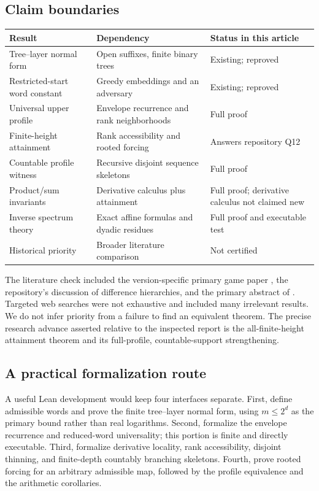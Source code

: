 \documentclass[11pt,letterpaper]{article}
\numberwithin{equation}{section}
\theoremstyle{definition}
\theoremstyle{remark}
\theoremstyle{definition}
\begin{document}
\subsection{Claim boundaries}
\begin{center}
\begin{tabular}{@{}>{\raggedright\arraybackslash}p{}
 >{\raggedright\arraybackslash}p{}
 >{\raggedright\arraybackslash}p{}@{}}
\toprule
Result & Dependency & Status in this article\\
\midrule
Tree--layer normal form & Open suffixes, finite binary trees & Existing; reproved\\
Restricted-start word constant & Greedy embeddings and an adversary & Existing; reproved\\
Universal upper profile & Envelope recurrence and rank neighborhoods & Full proof\\
Finite-height attainment & Rank accessibility and rooted forcing & Answers repository Q12\\
Countable profile witness & Recursive disjoint sequence skeletons & Full proof\\
Product/sum invariants & Derivative calculus plus attainment & Full proof; derivative calculus not claimed new\\
Inverse spectrum theory & Exact affine formulas and dyadic residues & Full proof and executable test\\
Historical priority & Broader literature comparison & Not certified\\
\bottomrule
\end{tabular}
\end{center}

The literature check included the version-specific primary game paper
\cite{CCS}, the repository's discussion of difference hierarchies, and the
primary abstract of \cite{BGKS}. Targeted web searches were not exhaustive and
included many irrelevant results. We do not infer priority from a failure to
find an equivalent theorem. The precise research advance asserted relative
to the inspected report is the all-finite-height attainment theorem and its
full-profile, countable-support strengthening.

\subsection{A practical formalization route}
A useful Lean development would keep four interfaces separate.
First, define admissible words and prove the finite tree--layer normal form,
using $m\le2^d$ as the primary bound rather than real logarithms. Second,
formalize the envelope recurrence and reduced-word universality; this portion
is finite and directly executable. Third, formalize derivative locality,
rank accessibility, disjoint thinning, and finite-depth countably branching
skeletons. Fourth, prove rooted forcing for an arbitrary admissible map,
followed by the profile equivalence and the arithmetic corollaries.
\end{document}

